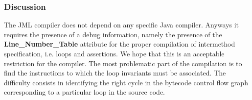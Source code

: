 \subsubsection{Discussion}
The JML compiler does not depend on any specific Java compiler. Anyways it requires the presence of a debug information, namely the presence of the \textbf{Line\_Number\_Table} attribute for the proper compilation of intermethod specification, i.e. loops and assertions. We hope that this is an acceptable restriction for the compiler.
The most problematic part of the compilation is to find the instructions to which the loop invariants must be associated. The difficulty consists in identifying the right cycle in the bytecode control flow graph corresponding to a particular loop in the source code. 
